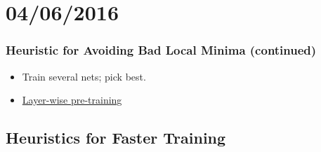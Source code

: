 \documentclass[10pt]{article}
\begin{document}
\section*{04/06/2016}
\subsubsection*{Heuristic for Avoiding Bad Local Minima (continued)}
\begin{itemize}
	\item Train several nets; pick best. 
	\item \underline{Layer-wise pre-training}
\end{itemize}

\subsection*{Heuristics for Faster Training}
\end{document}

